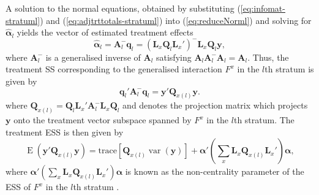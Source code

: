 \documentclass[article]{jss}
\newcommand{\Q}{\mathbf{Q}}
\newcommand{\A}{\mathbf{A}}
\newcommand{\mL}{\mathbf{L}}
\begin{document}
A solution to the normal equations, obtained by substituting (\ref{eq:infomat-stratuml}) and (\ref{eq:adjtrttotals-stratuml}) into (\ref{eq:reduceNorml}) and solving for $\hat{\bm{\alpha}}_l$ yields the vector of estimated treatment effects
\begin{equation}
\label{eq:trtVec}
\hat{\bm{\alpha}}_l = \A_{l}^{-} \bm{q}_l = (\mL_{x} \Q_l \mL_{x}')^{-} \mL_{x} \Q_l\bm{y},
\end{equation}
where $\A_{l}^{-}$ is a generalised inverse of $\A_{l}$ satisfying $\A_{l} \A_{l}^{-} \A_{l} = \A_{l}$. Thus, the treatment SS corresponding to the generalised interaction $F^{x}$ in the $l$th stratum is given by 
\begin{equation}
\label{eq:trtSS}
 \bm{q}_{l}' \A_{l}^{-} \bm{q}_{l} = \bm{y}'\Q_{x(l)} \bm{y}.
\end{equation}
where $\Q_{x(l)} = \Q_l \mL_{x}' \A_{l}^{-} \mL_{x} \Q_l$ and denotes the projection matrix which projects $\bm{y}$ onto the treatment vector subspace spanned by $F^x$ in the $l$th stratum. The treatment ESS is then given by 
\begin{equation}
\label{eq:ESSQuadTrt}
\operatorname{E}(\bm{y}'\Q_{x(l)} \bm{y})= \mathrm{trace}[\Q_{x(l)} \operatorname{var}(\bm{y})] + \bm{\alpha}'\left(\sum_x  \mL_{x}\Q_{x(l)} \mL_{x}'\right)\bm{\alpha},
\end{equation}
where $\bm{\alpha}'\left(\sum_x \mL_{x}\Q_{x(l)} \mL_{x}'\right)\bm{\alpha}$ is known as the non-centrality parameter of the ESS of $F^x$ in the $l$th stratum \citep{Searle1982}.
\end{document}
